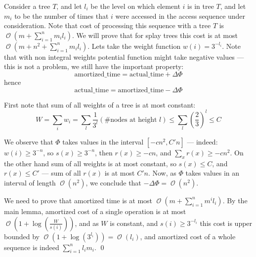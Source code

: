 \documentclass[11pt]{article}
\DeclareMathOperator*{\Oh}{\mathcal{O}}
\begin{document}
Consider a tree $T$, and let $l_i$ be the level on which element $i$ is in tree $T$, and let $m_i$ to be the number of times that $i$ were accessed in the access sequence under consideration.
Note that cost of processing this sequence with a tree $T$ is $\Oh(m + \sum_{i=1}^n m_i l_i)$. We will prove that for splay trees this cost is at most $\Oh(m + n^2 + \sum_{i=1}^n m_i l_i)$. Lets take the weight function $w(i) = 3^{-l_i}$. Note that with non integral weights potential function might take negative values --- this is not a problem, we still have the important property:
\begin{equation*}
\mathrm{amortized\_time} = \mathrm{actual\_time} + \Delta\Phi
\end{equation*}
hence
\begin{equation*}
\mathrm{actual\_time} = \mathrm{amortized\_time} - \Delta\Phi
\end{equation*}

First note that sum of all weights of a tree is at most constant:
\begin{equation*}
	W = \sum_{i} w_i = \sum_{l} \frac{1}{3^l} (\# \text{nodes at height }l) \leq \sum_l \left( \frac{2}{3} \right)^l \leq C
\end{equation*}

We observe that $\Phi$ takes values in the interval $[-c n^2, C' n]$ --- indeed: $w(i) \geq 3^{-n}$, so  $s(x) \geq 3^{-n}$, then $r(x) \geq -c n$, and $\sum_x r(x) \geq -c n^2$. On the other hand sum of all weights is at most constant, so $s(x) \leq C$, and $r(x) \leq C'$ --- sum of all $r(x)$ is at most $C' n$.  Now, as $\Phi$ takes values in an interval of length $\Oh(n^2)$, we conclude that $- \Delta\Phi = \Oh(n^2)$.

We need to prove that amortized time is at most $\Oh(m + \sum_{i=1}^n m^i l_i)$. By the main lemma, amortized cost of a single operation is at most $\Oh(1 + \log(\frac{W}{s(i)}))$, and as $W$ is constant, and $s(i) \geq 3^{-l_i}$ this cost is upper bounded by $\Oh(1 + \log(3^{l_i})) = \Oh(l_i)$, and amortized cost of a whole sequence is indeed $\sum_{i=1}^n l_i m_i$.
\qed

{}

\end{document}
